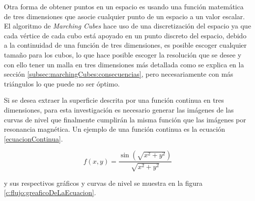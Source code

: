 Otra forma de obtener puntos en un espacio es usando una función matemática de tres dimensiones que asocie cualquier punto de un espacio a un valor escalar. El algoritmo de \emph{Marching Cubes} hace uso de una discretización del espacio ya que cada vértice de cada cubo está apoyado en un punto discreto del espacio, debido a la continuidad de una función de tres dimensiones, es posible escoger cualquier tamaño para los cubos, lo que hace posible escoger la resolución que se desee y con ello tener un malla en tres dimensiones más detallada como se explica en la sección \ref{subsec:marchingCubes:consecuencias}, pero necesariamente con más triángulos lo que puede no ser óptimo.

Si se desea extraer la superficie descrita por una función continua en tres dimensiones, para esta investigación es necesario generar las imágenes de las curvas de nivel que finalmente cumplirán la misma función que las imágenes por resonancia magnética. Un ejemplo de una función continua es la ecuación \ref{ecuacionContinua}.

\begin{equation}
f(x,y) = \frac{ \sin{(\sqrt{x^2+y^2})} }{ \sqrt{x^2+y^2} }
\label{ecuacionContinua}
\end{equation}

y sus respectivos gráficos y curvas de nivel se muestra en la figura \ref{c:flujo:greaficoDeLaEcuacion}.

